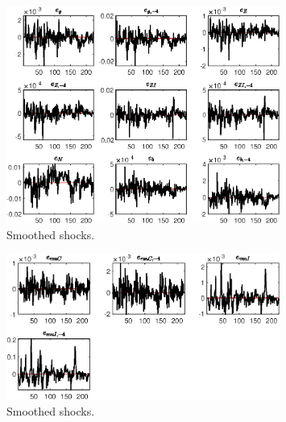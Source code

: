  
\begin{figure}[H]
\centering 
\includegraphics[width=0.80\textwidth]{BRS_sectoral_KK/graphs/BRS_sectoral_KK_SmoothedShocks1}
\caption{Smoothed shocks.}\label{Fig:SmoothedShocks:1}
\end{figure}

\begin{figure}[H]
\centering 
\includegraphics[width=0.80\textwidth]{BRS_sectoral_KK/graphs/BRS_sectoral_KK_SmoothedShocks2}
\caption{Smoothed shocks.}\label{Fig:SmoothedShocks:2}
\end{figure}


